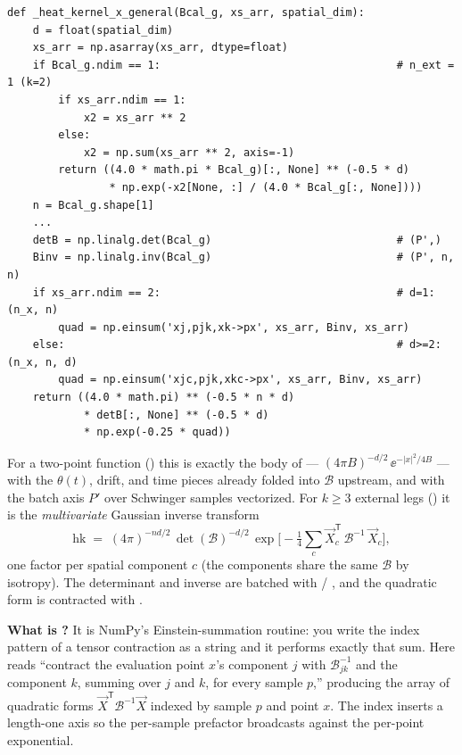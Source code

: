 \begin{lstlisting}
def _heat_kernel_x_general(Bcal_g, xs_arr, spatial_dim):
    d = float(spatial_dim)
    xs_arr = np.asarray(xs_arr, dtype=float)
    if Bcal_g.ndim == 1:                                     # n_ext = 1 (k=2)
        if xs_arr.ndim == 1:
            x2 = xs_arr ** 2
        else:
            x2 = np.sum(xs_arr ** 2, axis=-1)
        return ((4.0 * math.pi * Bcal_g)[:, None] ** (-0.5 * d)
                * np.exp(-x2[None, :] / (4.0 * Bcal_g[:, None])))
    n = Bcal_g.shape[1]
    ...
    detB = np.linalg.det(Bcal_g)                             # (P',)
    Binv = np.linalg.inv(Bcal_g)                             # (P', n, n)
    if xs_arr.ndim == 2:                                     # d=1: (n_x, n)
        quad = np.einsum('xj,pjk,xk->px', xs_arr, Binv, xs_arr)
    else:                                                    # d>=2: (n_x, n, d)
        quad = np.einsum('xjc,pjk,xkc->px', xs_arr, Binv, xs_arr)
    return ((4.0 * math.pi) ** (-0.5 * n * d)
            * detB[:, None] ** (-0.5 * d)
            * np.exp(-0.25 * quad))
\end{lstlisting}

For a two-point function () this is exactly the body of
 --- $(4\pi B)^{-d/2}\,\ee^{-|x|^{2}/4B}$ --- with
the $\theta(t)$, drift, and time pieces already folded into $\mathcal{B}$
upstream, and with the batch axis $P'$ over Schwinger samples vectorized. For
$k\ge 3$ external legs () it is the \emph{multivariate}
Gaussian inverse transform
\[
  \text{hk} \;=\; (4\pi)^{-nd/2}\,\det(\mathcal{B})^{-d/2}\,
  \exp\!\Big[-\tfrac14\sum_c \vec X_c^{\mathsf T}\,\mathcal{B}^{-1}\,\vec X_c\Big],
\]
one factor per spatial component $c$ (the components share the same
$\mathcal{B}$ by isotropy). The determinant and inverse are batched with
 / , and the quadratic form is contracted
with .

\begin{note}
\textbf{What is ?} It is NumPy's Einstein-summation routine:
you write the index pattern of a tensor contraction as a string and it performs
exactly that sum. Here  reads ``contract the evaluation
point $x$'s component $j$ with $\mathcal{B}^{-1}_{jk}$ and the component $k$,
summing over $j$ and $k$, for every sample $p$,'' producing the array of
quadratic forms $\vec X^{\mathsf T}\mathcal{B}^{-1}\vec X$ indexed by sample $p$
and point $x$. The \code{[:, None]} index inserts a length-one axis so the
per-sample prefactor broadcasts against the per-point exponential.
\end{note}

